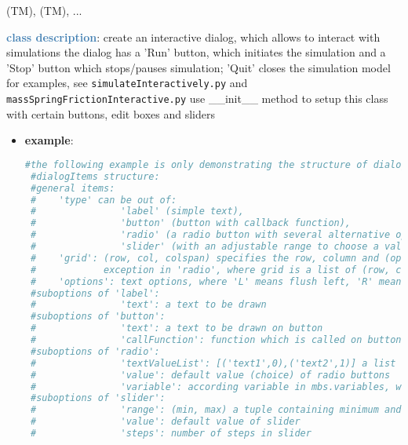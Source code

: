 \begin{itemize}[leftmargin=1.4cm]
\begin{itemize}[leftmargin=1.4cm]
\begin{itemize}[leftmargin=0.5cm]
\begin{itemize}[leftmargin=1.4cm]
\begin{itemize}[leftmargin=1.4cm]
\begin{itemize}[leftmargin=0.5cm]
\begin{itemize}[leftmargin=1.4cm]
\begin{itemize}[leftmargin=0.5cm]
\begin{itemize}[leftmargin=1.4cm]
\begin{itemize}[leftmargin=1.4cm]
 (TM), 
 (TM), 
 ...
\ei

%
\noindent\textcolor{steelblue}{{\bf class description}}:  create an interactive dialog, which allows to interact with simulations
the dialog has a 'Run' button, which initiates the simulation and a 'Stop' button which stops/pauses simulation; 'Quit' closes the simulation model
for examples, see \texttt{simulateInteractively.py} and \texttt{massSpringFrictionInteractive.py}
use \_\_init\_\_ method to setup this class with certain buttons, edit boxes and sliders
\setlength{\itemindent}{0.7cm}
\begin{itemize}[leftmargin=0.7cm]
  \item[--]  {\bf example}: \vspace{-12pt}\ei\begin{lstlisting}[language=Python, xleftmargin=36pt]
#the following example is only demonstrating the structure of dialogItems and plots
 #dialogItems structure:
 #general items:
 #    'type' can be out of:
 #               'label' (simple text),
 #               'button' (button with callback function),
 #               'radio' (a radio button with several alternative options),
 #               'slider' (with an adjustable range to choose a value)
 #    'grid': (row, col, colspan) specifies the row, column and (optionally) the span of columns the item is placed at;
 #            exception in 'radio', where grid is a list of (row, col) for every choice
 #    'options': text options, where 'L' means flush left, 'R' means flush right
 #suboptions of 'label':
 #               'text': a text to be drawn
 #suboptions of 'button':
 #               'text': a text to be drawn on button
 #               'callFunction': function which is called on button-press
 #suboptions of 'radio':
 #               'textValueList': [('text1',0),('text2',1)] a list of texts with according values
 #               'value': default value (choice) of radio buttons
 #               'variable': according variable in mbs.variables, which is set to current radio button value
 #suboptions of 'slider':
 #               'range': (min, max) a tuple containing minimum and maximum value of slider
 #               'value': default value of slider
 #               'steps': number of steps in slider

\end{lstlisting}
\end{itemize}
\end{itemize}
\end{itemize}
\end{itemize}
\end{itemize}
\end{itemize}
\end{itemize}
\end{itemize}
\end{itemize}
\end{itemize}
\end{itemize}
